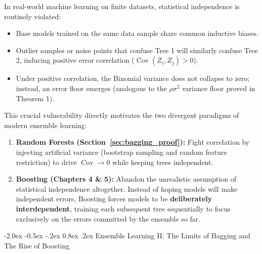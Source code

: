 \documentclass[11pt,a4paper]{article}
\makeatletter
\renewcommand\section{\@startsection {section}{1}{\z@}%
                                   {-2.0ex \@plus -0.5ex \@minus -.2ex}%
                                   {0.8ex \@plus.2ex}%
                                   {\normalfont\large\bfseries}}
\newcommand{\Cov}{\operatorname{Cov}}
\makeatother
\begin{document}
In real-world machine learning on finite datasets, statistical independence is routinely violated:
\begin{itemize}
    \item Base models trained on the same data sample share common inductive biases.
    \item Outlier samples or noise points that confuse Tree 1 will similarly confuse Tree 2, inducing positive error correlation ($\Cov(Z_i, Z_j) > 0$).
    \item Under positive correlation, the Binomial variance does not collapse to zero; instead, an error floor emerges (analogous to the $\rho \sigma^2$ variance floor proved in Theorem 1).
\end{itemize}
This crucial vulnerability directly motivates the two divergent paradigms of modern ensemble learning:
\begin{enumerate}
    \item \textbf{Random Forests (Section~\ref{sec:bagging_proof}):} Fight correlation by injecting artificial variance (bootstrap sampling and random feature restriction) to drive $\Cov \to 0$ while keeping trees independent.
    \item \textbf{Boosting (Chapters 4 \& 5):} Abandon the unrealistic assumption of statistical independence altogether. Instead of hoping models will make independent errors, Boosting forces models to be \textbf{deliberately interdependent}, training each subsequent tree sequentially to focus exclusively on the errors committed by the ensemble so far.
\end{enumerate}

\section{Ensemble Learning II: The Limits of Bagging and The Rise of Boosting}
\end{document}
